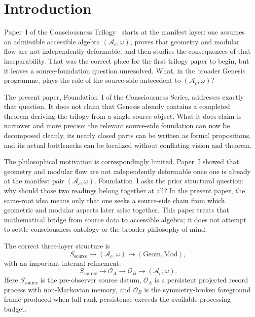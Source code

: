 \documentclass[12pt]{article}
\theoremstyle{definition}
\theoremstyle{remark}
\begin{document}
\clearpage
\tableofcontents
\clearpage

\section{Introduction}

Paper~I of the Consciousness Trilogy~\cite{PaperI} starts at the
manifest layer: one assumes an admissible accessible algebra
\((\mathcal A_c,\omega)\), proves that geometry and modular flow are not
independently deformable, and then studies the consequences of that
inseparability. That was the correct place for the first trilogy paper
to begin, but it leaves a source-foundation question unresolved. What, in
the broader Genesis programme, plays the role of the source-side
antecedent to \((\mathcal A_c,\omega)\)?

The present paper, Foundation~I of the Consciousness Series, addresses
exactly that question. It does not claim that Genesis already contains a
completed theorem deriving the trilogy from a single source object. What
it does claim is narrower and more precise: the relevant source-side
foundation can now be decomposed cleanly, its nearly closed parts can be
written as formal propositions, and its actual bottlenecks can be
localized without conflating vision and theorem.

The philosophical motivation is correspondingly limited. Paper~I showed
that geometry and modular flow are not independently deformable once one
is already at the manifest pair \((\mathcal A_c,\omega)\).
Foundation~I asks the prior structural question: why should those two
readings belong together at all? In the present paper, the same-root
idea means only that one seeks a source-side chain from which geometric
and modular aspects later arise together. This paper treats that
mathematical bridge from source data to accessible algebra; it does not
attempt to settle consciousness ontology or the broader philosophy of
mind.

The correct three-layer structure is
\[
S_{\mathrm{source}} \longrightarrow (\mathcal A_c,\omega)
\longrightarrow (\mathrm{Geom},\mathrm{Mod}),
\]
with an important internal refinement:
\[
S_{\mathrm{source}}
\longrightarrow
\mathcal O_A
\longrightarrow
\mathcal O_B
\longrightarrow
(\mathcal A_c,\omega).
\]
Here \(S_{\mathrm{source}}\) is the pre-observer source datum,
\(\mathcal O_A\) is a persistent projected record process with
non-Markovian memory, and \(\mathcal O_B\) is the symmetry-broken
foreground frame produced when full-rank persistence exceeds the
available processing budget.
\end{document}

